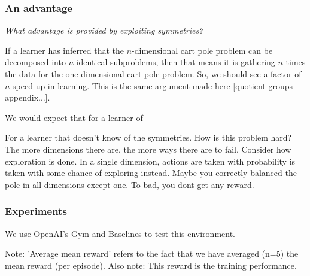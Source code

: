 
\subsubsection{An advantage}

\begin{displayquote}
\textit{What advantage is provided by exploiting symmetries?}
\end{displayquote}

If a learner has inferred that the $n$-dimensional cart pole problem can be decomposed into $n$ identical subproblems,
then that means it is gathering $n$ times the data for the one-dimensional cart pole problem.
So, we should see a factor of $n$ speed up in learning.
This is the same argument made here [quotient groups appendix...].

We would expect that for a learner of

For a learner that doesn't know of the symmetries. How is this problem hard?
The more dimensions there are, the more ways there are to fail.
Consider how exploration is done. In a single dimension, actions are taken with probability  is
taken with some chance of exploring instead.
Maybe you correctly balanced the pole in all dimensions except one. To bad, you dont get any reward.

\subsubsection{Experiments}

We use OpenAI's Gym \cite{Brockman2016} and Baselines \cite{baselines} to test this environment.


Note: 'Average mean reward' refers to the fact that we have averaged (n=5)
the mean reward (per episode). Also note: This reward is the training performance.

